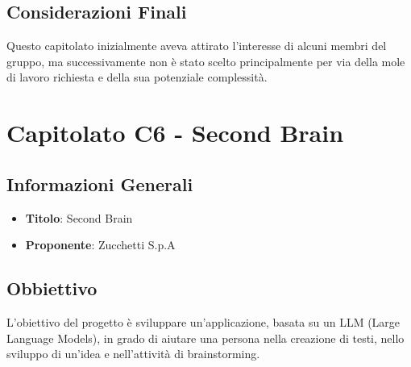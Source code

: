 \documentclass[a4paper,12pt]{article}
\begin{document}
    \subsection{Considerazioni Finali}
    Questo capitolato inizialmente aveva attirato l’interesse di alcuni membri del gruppo, ma successivamente non è stato scelto principalmente per via della mole di lavoro richiesta e della sua potenziale complessità.


    \section{Capitolato C6 - Second Brain}
    \subsection{Informazioni Generali}
        \begin{itemize}
            \item \textbf{Titolo}: Second Brain
            \item \textbf{Proponente}: Zucchetti S.p.A
        \end{itemize}
    \subsection{Obbiettivo}
    L’obiettivo del progetto è sviluppare un’applicazione, basata su un LLM (Large Language Models), in grado di aiutare una persona nella creazione di testi, nello sviluppo di un’idea e nell’attività di brainstorming.
\end{document}
